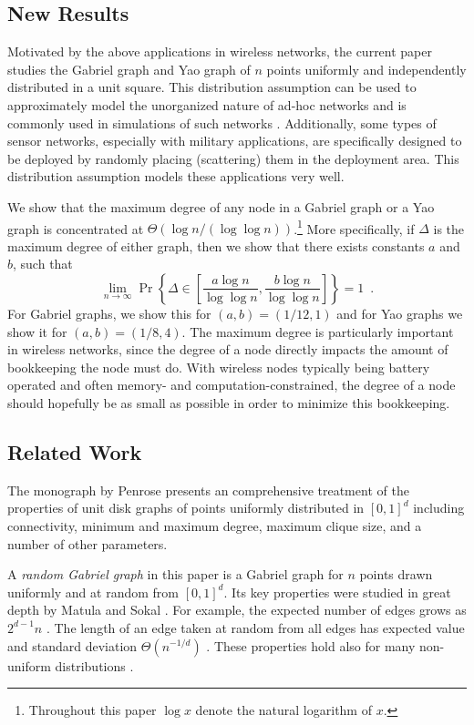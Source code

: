 \documentclass[10pt]{llncs}
\newcommand{\PROB}{\Pr}
\begin{document}
\subsection{New Results}

Motivated by the above applications in wireless networks, the current paper
studies the Gabriel graph and Yao graph of $n$ points uniformly and
independently distributed in a unit square.  This distribution assumption
can be used to approximately model the unorganized nature of ad-hoc
networks and is commonly used in simulations of such networks \cite{tma09}.
Additionally, some types of sensor networks, especially with military
applications, are specifically designed to be deployed by randomly placing
(scattering) them in the deployment area. This distribution assumption
models these applications very well.

We show that the maximum degree of any node in a Gabriel
graph or a Yao graph is concentrated at $\Theta(\log n/(\log\log
n))$.\footnote{Throughout this paper $\log x$ denote the natural logarithm
of $x$.} More specifically, if $\Delta$ is the maximum degree of either
graph, then we show that there exists constants $a$ and $b$, such that
\[
    \lim_{n\rightarrow\infty}
       \PROB\left\{\Delta\in \left[\frac{a\log n}{\log\log n},
                         \frac{b\log n}{\log\log n}\right]\right\} = 1
       \enspace .
\]
For Gabriel graphs, we show this for $(a,b)=(1/12,1)$ and for Yao graphs
we show it for $(a,b)=(1/8,4)$.  The maximum degree is particularly
important in wireless networks, since the degree of a node directly impacts
the amount of bookkeeping the node must do.  With wireless nodes typically
being battery operated and often memory- and computation-constrained, the
degree of a node should hopefully be as small as possible in order to
minimize this bookkeeping.

\subsection{Related Work}

The monograph by Penrose \cite{p03} presents an comprehensive treatment of
the properties of unit disk graphs of points uniformly distributed in
$[0,1]^d$ including connectivity, minimum and maximum degree, maximum
clique size, and a number of other parameters.

A \emph{random Gabriel graph} in this paper is a Gabriel graph for $n$
points drawn uniformly and at random from $[0,1]^d$.  Its key properties
were studied in great depth by Matula and Sokal \cite{ms80}.  For example,
the expected number of edges grows as $2^{d-1} n$ \cite{d88,ms80}.  The
length of an edge taken at random from all edges has expected value and
standard deviation $\Theta(n^{-1/d})$ \cite{d88}.  These properties hold
also for many non-uniform distributions \cite{d88}.  
\end{document}
